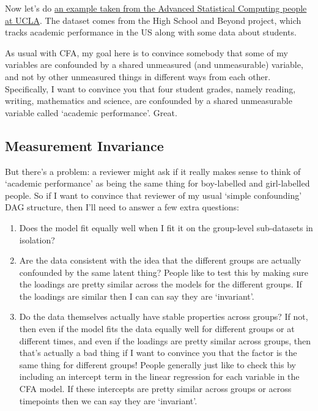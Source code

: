 \documentclass[
  letterpaper,
  DIV=11,
  numbers=noendperiod]{scrreprt}
\providecommand{\tightlist}{%
  \setlength{\itemsep}{0pt}\setlength{\parskip}{0pt}}\usepackage{longtable,booktabs,array}
\begin{document}
Now let's do \href{https://stats.oarc.ucla.edu/r/seminars/lgm/}{an
example taken from the Advanced Statistical Computing people at UCLA}.
The dataset comes from the High School and Beyond project, which tracks
academic performance in the US along with some data about students.

As usual with CFA, my goal here is to convince somebody that some of my
variables are confounded by a shared unmeasured (and unmeasurable)
variable, and not by other unmeasured things in different ways from each
other. Specifically, I want to convince you that four student grades,
namely reading, writing, mathematics and science, are confounded by a
shared unmeasurable variable called `academic performance'. Great.

\hypertarget{measurement-invariance}{%
\subsection*{Measurement Invariance}\label{measurement-invariance}}

But there's a problem: a reviewer might ask if it really makes sense to
think of `academic performance' as being the same thing for boy-labelled
and girl-labelled people. So if I want to convince that reviewer of my
usual `simple confounding' DAG structure, then I'll need to answer a few
extra questions:

\begin{enumerate}
\def\labelenumi{\arabic{enumi}.}
\tightlist
\item
  Does the model fit equally well when I fit it on the group-level
  sub-datasets in isolation?
\item
  Are the data consistent with the idea that the different groups are
  actually confounded by the same latent thing? People like to test this
  by making sure the loadings are pretty similar across the models for
  the different groups. If the loadings are similar then I can can say
  they are `invariant'.
\item
  Do the data themselves actually have stable properties across groups?
  If not, then even if the model fits the data equally well for
  different groups or at different times, and even if the loadings are
  pretty similar across groups, then that's actually a bad thing if I
  want to convince you that the factor is the same thing for different
  groups! People generally just like to check this by including an
  intercept term in the linear regression for each variable in the CFA
  model. If these intercepts are pretty similar across groups or across
  timepoints then we can say they are `invariant'.
\end{enumerate}
\end{document}
